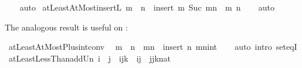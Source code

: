 \begin{isabellebody}
\ \ %
\endisadelimproof
%
\isatagproof
{}\isamarkupfalse%
\ auto%
\endisatagproof
{\isafoldproof}%
%
\isadelimproof
\isanewline
%
\endisadelimproof
\isanewline
{}\isamarkupfalse%
\ atLeastAtMost{\isacharunderscore}{\kern0pt}insertL{\isacharcolon}{\kern0pt}\ {\isachardoublequoteopen}m\ {\isasymle}\ n\ {\isasymLongrightarrow}\ insert\ m\ {\isacharbraceleft}{\kern0pt}Suc\ m{\isachardot}{\kern0pt}{\isachardot}{\kern0pt}n{\isacharbraceright}{\kern0pt}\ {\isacharequal}{\kern0pt}\ {\isacharbraceleft}{\kern0pt}m\ {\isachardot}{\kern0pt}{\isachardot}{\kern0pt}n{\isacharbraceright}{\kern0pt}{\isachardoublequoteclose}\isanewline
%
\isadelimproof
\ \ %
\endisadelimproof
%
\isatagproof
{}\isamarkupfalse%
\ auto%
\endisatagproof
{\isafoldproof}%
%
\isadelimproof
%
\endisadelimproof
%
\begin{isamarkuptext}%
The analogous result is useful on :%
\end{isamarkuptext}\isamarkuptrue%
\isamarkupfalse%
\ atLeastAtMostPlus{}{\isacharunderscore}{\kern0pt}int{\isacharunderscore}{\kern0pt}conv{\isacharcolon}{\kern0pt}\isanewline
\ \ {\isachardoublequoteopen}m\ {\isasymle}\ {}{\isacharplus}{\kern0pt}n\ {\isasymLongrightarrow}\ {\isacharbraceleft}{\kern0pt}m{\isachardot}{\kern0pt}{\isachardot}{\kern0pt}{}{\isacharplus}{\kern0pt}n{\isacharbraceright}{\kern0pt}\ {\isacharequal}{\kern0pt}\ insert\ {\isacharparenleft}{\kern0pt}{}{\isacharplus}{\kern0pt}n{\isacharparenright}{\kern0pt}\ {\isacharbraceleft}{\kern0pt}m{\isachardot}{\kern0pt}{\isachardot}{\kern0pt}n{\isacharcolon}{\kern0pt}{\isacharcolon}{\kern0pt}int{\isacharbraceright}{\kern0pt}{\isachardoublequoteclose}\isanewline
%
\isadelimproof
\ \ %
\endisadelimproof
%
\isatagproof
{}\isamarkupfalse%
\ {\isacharparenleft}{\kern0pt}auto\ intro{\isacharcolon}{\kern0pt}\ set{\isacharunderscore}{\kern0pt}eqI{\isacharparenright}{\kern0pt}%
\endisatagproof
{\isafoldproof}%
%
\isadelimproof
\isanewline
%
\endisadelimproof
\isanewline
{}\isamarkupfalse%
\ atLeastLessThan{\isacharunderscore}{\kern0pt}add{\isacharunderscore}{\kern0pt}Un{\isacharcolon}{\kern0pt}\ {\isachardoublequoteopen}i\ {\isasymle}\ j\ {\isasymLongrightarrow}\ {\isacharbraceleft}{\kern0pt}i{\isachardot}{\kern0pt}{\isachardot}{\kern0pt}{\isacharless}{\kern0pt}j{\isacharplus}{\kern0pt}k{\isacharbraceright}{\kern0pt}\ {\isacharequal}{\kern0pt}\ {\isacharbraceleft}{\kern0pt}i{\isachardot}{\kern0pt}{\isachardot}{\kern0pt}{\isacharless}{\kern0pt}j{\isacharbraceright}{\kern0pt}\ {\isasymunion}\ {\isacharbraceleft}{\kern0pt}j{\isachardot}{\kern0pt}{\isachardot}{\kern0pt}{\isacharless}{\kern0pt}j{\isacharplus}{\kern0pt}k{\isacharcolon}{\kern0pt}{\isacharcolon}{\kern0pt}nat{\isacharbraceright}{\kern0pt}{\isachardoublequoteclose}\isanewline

\end{isabellebody}

